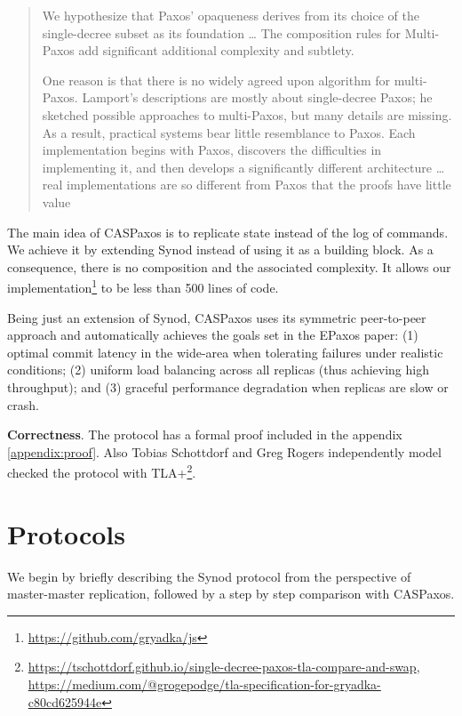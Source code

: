 \documentclass[a4paper,USenglish]{lipics-v2018}
\theoremstyle{definition}
\begin{document}
    \begin{quote}
        We hypothesize that Paxos’ opaqueness derives from its choice of the single-decree subset as its foundation \ldots{} The composition rules for Multi-Paxos add significant additional complexity and subtlety.

        One reason is that there is no widely agreed upon algorithm for multi-Paxos. Lamport’s descriptions are mostly about single-decree Paxos; he sketched possible approaches to multi-Paxos, but many details are missing. As a result, practical systems bear little resemblance to Paxos. Each implementation begins with Paxos, discovers the difficulties in implementing it, and then develops a significantly different architecture \ldots{} real implementations are so different from Paxos that the proofs have little value
    \end{quote}

    The main idea of CASPaxos is to replicate state instead of the log of commands. We achieve it by extending Synod instead of using it as a building block. As a consequence, there is no composition and the associated complexity. It allows our implementation\footnote{\href{https://github.com/gryadka/js}{https://github.com/gryadka/js}} to be less than 500 lines of code.

    Being just an extension of Synod, CASPaxos uses its symmetric peer-to-peer approach and automatically achieves the goals set in the EPaxos\cite{epaxos} paper: (1) optimal commit latency in the wide-area when tolerating failures under realistic conditions; (2) uniform load balancing across all replicas (thus achieving high throughput); and (3) graceful performance degradation when replicas are slow or crash.

    {\bf Correctness}. The protocol has a formal proof included in the appendix \ref{appendix:proof}. Also Tobias Schottdorf and Greg Rogers independently model checked the protocol with TLA+\footnote{\href{https://tschottdorf.github.io/single-decree-paxos-tla-compare-and-swap}{https://tschottdorf.github.io/single-decree-paxos-tla-compare-and-swap}, \href{https://medium.com/@grogepodge/tla-specification-for-gryadka-c80cd625944e}{https://medium.com/@grogepodge/tla-specification-for-gryadka-c80cd625944e}}.

\section{Protocols}

    We begin by briefly describing the Synod protocol from the perspective of master-master replication, followed by a step by step comparison with CASPaxos.
\end{document}
